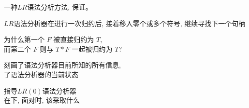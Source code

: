 \begin{frame}{}
  \begin{center}
    \begin{theorem}
      一种$LR$语法分析方法, 保证。
    \end{theorem}

    \vspace{0.60cm}
    $LR$语法分析器在进行一次归约后, 接着移入零个或多个符号, 继续寻找下一个句柄
  \end{center}
\end{frame}

\begin{frame}{}
  \begin{center}
    为什么第一个 $F$ 被直接归约为 $T$, \\[6pt]
    而第二个 $F$ 则与 $T \ast F$ 一起被归约为 $T$?


    \pause
    \vspace{0.30cm}
    刻画了语法分析器目前所知的所有信息, \\[6pt]
    了语法分析器的当前状态
  \end{center}
\end{frame}

\begin{frame}{}
  \begin{center}

    \vspace{0.60cm}
    指导$LR(0)$语法分析器 \\[6pt]
    在下, 面对时, 该采取什么
  \end{center}
\end{frame}

\begin{frame}{}
  \begin{center}

    \vspace{0.30cm}
    
  \end{center}
\end{frame}

